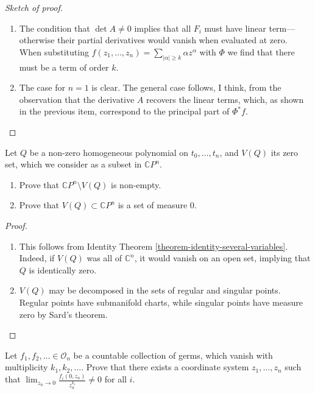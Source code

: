 \begin{proof}[Sketch of proof]
\begin{enumerate}
\item The condition that $\det A \neq 0$ implies that all $F_i$ must have linear
term---otherwise their partial derivatives would vanish when evaluated at zero.
When substituting $f(z_1,\ldots,z_n)=\sum_{|\alpha|\geq k}\alpha z^\alpha$ with
$\Phi$ we find that there must be a term of order $k$.
\item The case for $n=1$ is clear. The general case follows, I think, from the
observation that the derivative $A$ recovers the linear terms, which, as shown
in the previous item, correspond to the principal part of $\Phi^*f$.
\end{enumerate}
\end{proof}

\begin{exercise}
\label{exercise-zero-locus-of-homogeneous-polynomial}
Let $Q$ be a non-zero homogeneous polynomial on $t_0,\ldots,t_n$, and $V(Q)$ its
zero set, which we consider as a subset in $\mathbb{C}P^{n}$.
\begin{enumerate}
\item Prove that $\mathbb{C}P^{n}\setminus V(Q)$ is non-empty.
\item Prove that $V(Q)\subset\mathbb{C}P^{n}$ is a set of measure 0.
\end{enumerate}
\end{exercise}

\begin{proof}
\begin{enumerate}
\item This follows from Identity Theorem
\ref{theorem-identity-several-variables}. Indeed, if $V(Q)$ was all of
$\mathbb{C}^{n}$, it would vanish on an open set, implying that $Q$ is
identically zero.
\item $V(Q)$ may be decomposed in the sets of regular and singular points.
Regular points have submanifold charts, while singular points have measure zero
by Sard's theorem.
\end{enumerate}
\end{proof}

\begin{exercise}
\label{exercise-principal-parts}
Let $f_1,f_2,\ldots\in \mathcal{O}_n$ be a countable collection of germs, which
vanish with multiplicity $k_1,k_2,\ldots$. Prove that there exists a coordinate
system $z_1,\ldots,z_n$ such that 
$\lim_{z_n\to 0} \frac{f_i(0,z_n)}{z_n^{k_i}}\neq 0$ for all $i$.
\end{exercise}

